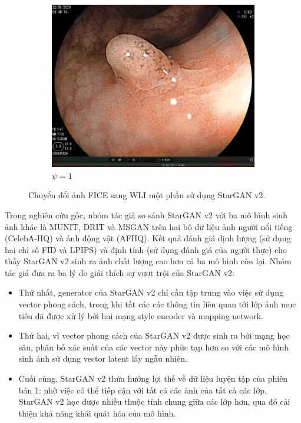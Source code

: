 \documentclass[12pt]{extreport}
\begin{document}
\begin{figure}[H]
\begin{subfigure}[H]{0.19\textwidth}
        \includegraphics[width=\linewidth]{psi/1.jpeg}
        \caption{$ \psi = 1 $}
    \end{subfigure}
    \caption{Chuyển đổi ảnh FICE sang WLI một phần sử dụng StarGAN v2.}
\end{figure}

Trong nghiên cứu gốc, nhóm tác giả so sánh StarGAN v2 với ba mô hình sinh ảnh khác là MUNIT, DRIT và MSGAN trên hai bộ dữ liệu ảnh người nổi tiếng (CelebA-HQ) và ảnh động vật (AFHQ). Kết quả đánh giá định lượng (sử dụng hai chỉ số FID và LPIPS) và định tính (sử dụng đánh giá của người thực) cho thấy StarGAN v2 sinh ra ảnh chất lượng cao hơn cả ba mô hình còn lại. Nhóm tác giả đưa ra ba lý do giải thích sự vượt trội của StarGAN v2:
\begin{itemize}
    \item Thứ nhất, generator của StarGAN v2 chỉ cần tập trung vào việc sử dụng vector phong cách, trong khi tất các các thông tin liên quan tới lớp ảnh mục tiêu đã được xử lý bởi hai mạng style encoder và mapping network.
    \item Thứ hai, vì vector phong cách của StarGAN v2 được sinh ra bởi mạng học sâu, phân bố xác suất của các vector này phức tạp hơn so với các mô hình sinh ảnh sử dụng vector latent lấy ngẫu nhiên.
    \item Cuối cùng, StarGAN v2 thừa hưởng lợi thế về dữ liệu luyện tập của phiên bản 1: nhờ việc có thể tiếp cận với tất cả các ảnh của tất cả các lớp, StarGAN v2 học được nhiều thuộc tính chung giữa các lớp hơn, qua đó cải thiện khả năng khái quát hóa của mô hình.
\end{itemize}
\end{document}
